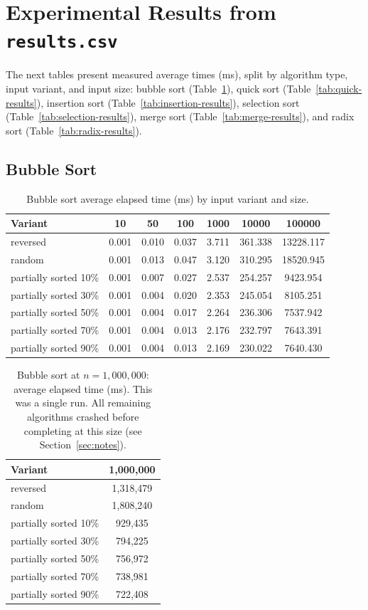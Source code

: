 \documentclass[11pt,a4paper]{article}
\begin{document}
\section{Experimental Results from \texttt{results.csv}}
The next tables present measured average times (ms), split by algorithm type, input variant, and input size: bubble sort (Table~\ref{tab:bubble-results}), quick sort (Table~\ref{tab:quick-results}), insertion sort (Table~\ref{tab:insertion-results}), selection sort (Table~\ref{tab:selection-results}), merge sort (Table~\ref{tab:merge-results}), and radix sort (Table~\ref{tab:radix-results}).

\subsection{Bubble Sort}
\begin{table}[H]
\centering
\footnotesize
\begin{tabular}{lcccccc}
\toprule
Variant & 10 & 50 & 100 & 1000 & 10000 & 100000 \\
\midrule
reversed & 0.001 & 0.010 & 0.037 & 3.711 & 361.338 & 13228.117 \\
random & 0.001 & 0.013 & 0.047 & 3.120 & 310.295 & 18520.945 \\
partially sorted 10\% & 0.001 & 0.007 & 0.027 & 2.537 & 254.257 & 9423.954 \\
partially sorted 30\% & 0.001 & 0.004 & 0.020 & 2.353 & 245.054 & 8105.251 \\
partially sorted 50\% & 0.001 & 0.004 & 0.017 & 2.264 & 236.306 & 7537.942 \\
partially sorted 70\% & 0.001 & 0.004 & 0.013 & 2.176 & 232.797 & 7643.391 \\
partially sorted 90\% & 0.001 & 0.004 & 0.013 & 2.169 & 230.022 & 7640.430 \\
\bottomrule
\end{tabular}
\caption{Bubble sort average elapsed time (ms) by input variant and size.}
\label{tab:bubble-results}
\end{table}

\begin{table}[H]
\centering
\begin{tabular}{lc}
\toprule
Variant & 1{,}000{,}000 \\
\midrule
reversed & 1{,}318{,}479 \\
random & 1{,}808{,}240 \\
partially sorted 10\% & 929{,}435 \\
partially sorted 30\% & 794{,}225 \\
partially sorted 50\% & 756{,}972 \\
partially sorted 70\% & 738{,}981 \\
partially sorted 90\% & 722{,}408 \\
\bottomrule
\end{tabular}
\caption{Bubble sort at \(n=1{,}000{,}000\): average elapsed time (ms). This was a single run. All remaining algorithms crashed before completing at this size (see Section~\ref{sec:notes}).}
\label{tab:bubble-1m}
\end{table}
\end{document}
